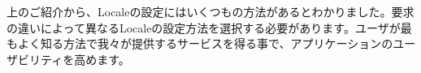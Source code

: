 上のご紹介から、Localeの設定にはいくつもの方法があるとわかりました。要求の違いによって異なるLocaleの設定方法を選択する必要があります。ユーザが最もよく知る方法で我々が提供するサービスを得る事で、アプリケーションのユーザビリティを高めます。
